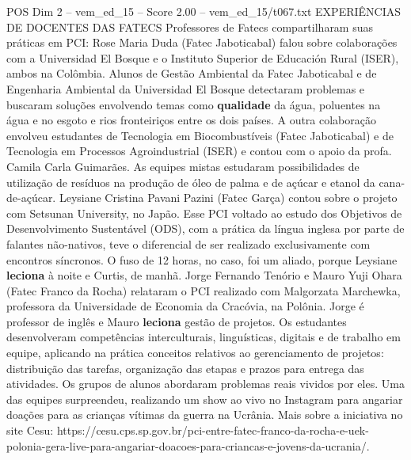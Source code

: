 \begin{textsample}{POS Dim 2 – vem\_ed\_15 – Score 2.00 – vem\_ed\_15/t067.txt}  \label{ex:f2_pos_164}
EXPERIÊNCIAS DE DOCENTES DAS FATECS Professores de Fatecs compartilharam suas práticas em PCI: Rose Maria Duda (Fatec Jaboticabal) falou sobre colaborações com a Universidad El Bosque e o Instituto Superior de Educación Rural (ISER), ambos na Colômbia.
Alunos de Gestão Ambiental da Fatec Jaboticabal e de Engenharia Ambiental da Universidad El Bosque detectaram problemas e buscaram soluções envolvendo temas como \textbf{qualidade} da água, poluentes na água e no esgoto e rios fronteiriços entre os dois países.
A outra colaboração envolveu estudantes de Tecnologia em Biocombustíveis (Fatec Jaboticabal) e de Tecnologia em Processos Agroindustrial (ISER) e contou com o apoio da profa.
Camila Carla Guimarães.
As equipes mistas estudaram possibilidades de utilização de resíduos na produção de óleo de palma e de açúcar e etanol da cana-de-açúcar.
Leysiane Cristina Pavani Pazini (Fatec Garça) contou sobre o projeto com Setsunan University, no Japão.
Esse PCI voltado ao estudo dos Objetivos de Desenvolvimento Sustentável (ODS), com a prática da língua inglesa por parte de falantes não-nativos, teve o diferencial de ser realizado exclusivamente com encontros síncronos.
O fuso de 12 horas, no caso, foi um aliado, porque Leysiane \textbf{leciona} à noite e Curtis, de manhã.
Jorge Fernando Tenório e Mauro Yuji Ohara (Fatec Franco da Rocha) relataram o PCI realizado com Malgorzata Marchewka, professora da Universidade de Economia da Cracóvia, na Polônia.
Jorge é professor de inglês e Mauro \textbf{leciona} gestão de projetos.
Os estudantes desenvolveram competências interculturais, linguísticas, digitais e de trabalho em equipe, aplicando na prática conceitos relativos ao gerenciamento de projetos: distribuição das tarefas, organização das etapas e prazos para entrega das atividades.
Os grupos de alunos abordaram problemas reais vividos por eles.
Uma das equipes surpreendeu, realizando um show ao vivo no Instagram para angariar doações para as crianças vítimas da guerra na Ucrânia.
Mais sobre a iniciativa no site Cesu: https://cesu.cps.sp.gov.br/pci-entre-fatec-franco-da-rocha-e-uek-polonia-gera-live-para-angariar-doacoes-para-criancas-e-jovens-da-ucrania/.

\end{textsample}
